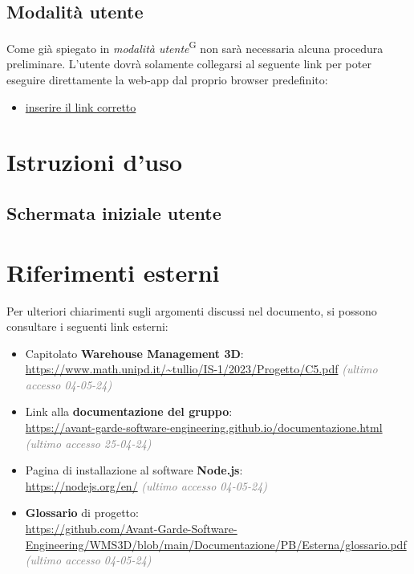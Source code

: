    \subsection{Modalità utente}\label{sec:install_run:user}
    Come già spiegato in \textit{modalità utente}\textsuperscript{G} non sarà necessaria alcuna procedura preliminare. L'utente dovrà solamente collegarsi al seguente link per poter eseguire 
    direttamente la web-app dal proprio browser predefinito: 
    \begin{itemize}
        \item\url{inserire il link corretto}
    \end{itemize}

    \newpage



    
\section{Istruzioni d'uso}\label{sec:Istruzioni_uso}

    \subsection{Schermata iniziale utente}\label{sec:inizio}






\newpage

\section{Riferimenti esterni}\label{sec:riferimenti_esterni}
Per ulteriori chiarimenti sugli argomenti discussi nel documento, si possono consultare i seguenti link esterni:
\begin{itemize}
    \item Capitolato \textbf{Warehouse Management 3D}:\\
    \url{https://www.math.unipd.it/~tullio/IS-1/2023/Progetto/C5.pdf} \textcolor{gray}{\textit{(ultimo accesso 04-05-24)}}
    \item Link alla \textbf{documentazione del gruppo}:\\
    \url{https://avant-garde-software-engineering.github.io/documentazione.html} \textcolor{gray}{\textit{(ultimo accesso 25-04-24)}}
    \item Pagina di installazione al software \textbf{Node.js}:\\
    \url{https://nodejs.org/en/} \textcolor{gray}{\textit{(ultimo accesso 04-05-24)}}
    \item \textbf{Glossario} di progetto: \\
    \url{https://github.com/Avant-Garde-Software-Engineering/WMS3D/blob/main/Documentazione/PB/Esterna/glossario.pdf} \textcolor{gray}{\textit{(ultimo accesso 04-05-24)}}
\end{itemize}